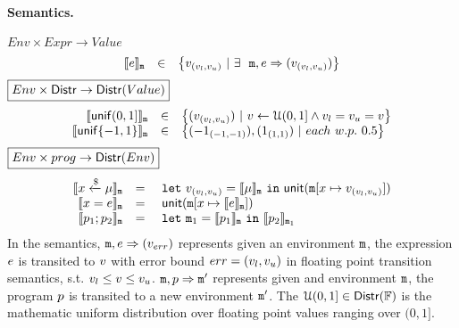 \documentclass[a4paper,11pt]{article}
\begin{document}
\paragraph{Semantics.}
$\boxed{Env \times Expr \to Value }$
%
\[
	\begin{array}{rcl}
	\llbracket e \rrbracket_{\mathtt{m}}
	& \in &  
	\big\{v_{(v_{l}, v_{u})} ~|~
	\exists ~~  
	\mathtt{m},  
	e \Rightarrow (v_{(v_{l}, v_{u})})\big\}
	\end{array}
\]
%
$
\boxed{Env \times \mathsf{Distr} \to 
\mathsf{Distr}(Value)}
$
%
\[
	\begin{array}{rcl}
	\llbracket \mathsf{unif}(0, 1] \rrbracket_{\mathtt{m}}
	& \in & 
	\big\{
	(v_{(v_{l}, v_{u})}) ~|~
	v \leftarrow \mathcal{U}(0, 1]
	\land v_{l} = v_{u} = v
	\big\}\\
	\llbracket \mathsf{unif}\{-1, 1\} \rrbracket_{\mathtt{m}}
	& \in & 
	\big\{
	(-1_{(-1, -1)}), (1_{(1, 1)}) ~|~
	each ~ w.p. ~ 0.5 
	\big\}\\	
	\end{array}
\]
%
$\boxed{Env \times prog \to \mathsf{Distr}(Env)}$
\[
\begin{array}{rcl}
	\llbracket x \xleftarrow{\$} \mu \rrbracket_{\mathtt{m}}
	& = & 
	~\mathtt{let}~ v_{(v_{l}, v_{u})} = \llbracket \mu \rrbracket_{\mathtt{m}}
	~\mathtt{in}~ 
	\mathsf{unit}(\mathtt{m}[x \mapsto v_{(v_{l}, v_{u})}])
	\\
	\llbracket x = e \rrbracket_{\mathtt{m}}
	& = &  
	~\mathsf{unit}(\mathtt{m}[x \mapsto \llbracket e \rrbracket_{\mathtt{m}}])
	\\
	\llbracket p_1; p_2 \rrbracket_{\mathtt{m}}
	& = &  ~\mathtt{let}~  \mathtt{m}_1 = 
	\llbracket p_1 \rrbracket_{\mathtt{m}} ~\mathtt{in}~
	\llbracket p_2 \rrbracket_{\mathtt{m}_1} 
\end{array}
\]
%
In the semantics, 
%
$\mathtt{m}, e \Rightarrow (v_{err})$ represents given an environment
%
$\mathtt{m}$, the expression $e$
%
is transited to $v$ with error bound $err = (v_{l}, v_{u})$
in floating point transition semantics,
%
s.t. $v_{l} \leq v \leq v_{u}$.
%
$\mathtt{m}, p \Rightarrow \mathtt{m}'$ represents given and environment $\mathtt{m}$,
%
the program $p$ is transited to a new environment $\mathtt{m}'$.
%
The $\mathcal{U}(0, 1] \in \mathsf{Distr}(\mathbb{F})$ is the mathematic uniform distribution over floating point values ranging over $(0, 1]$.
%
%
\end{document}
